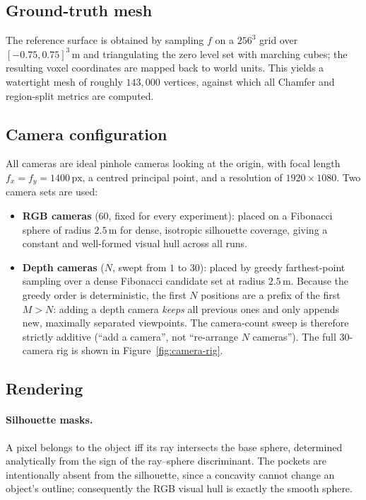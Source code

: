 \subsection{Ground-truth mesh}
\label{sec:dataset-gt}

The reference surface is obtained by sampling $f$ on a $256^{3}$ grid over $[-0.75, 0.75]^{3}\,\text{m}$
and triangulating the zero level set with marching cubes; the resulting voxel coordinates are mapped
back to world units. This yields a watertight mesh of roughly $143{,}000$ vertices, against which all
Chamfer and region-split metrics are computed.

\subsection{Camera configuration}
\label{sec:dataset-cameras}

All cameras are ideal pinhole cameras looking at the origin, with focal length
$f_{x} = f_{y} = 1400\,\text{px}$, a centred principal point, and a resolution of
$1920 \times 1080$. Two camera sets are used:
%
\begin{itemize}
  \item \textbf{RGB cameras} ($60$, fixed for every experiment): placed on a Fibonacci sphere of
    radius $2.5\,\text{m}$ for dense, isotropic silhouette coverage, giving a constant and well-formed
    visual hull across all runs.
  \item \textbf{Depth cameras} ($N$, swept from $1$ to $30$): placed by greedy farthest-point sampling
    over a dense Fibonacci candidate set at radius $2.5\,\text{m}$. Because the greedy order is
    deterministic, the first $N$ positions are a prefix of the first $M>N$: adding a depth camera
    \emph{keeps} all previous ones and only appends new, maximally separated viewpoints. The
    camera-count sweep is therefore strictly additive (``add a camera'', not ``re-arrange $N$
    cameras''). The full $30$-camera rig is shown in Figure~\ref{fig:camera-rig}.
\end{itemize}

\subsection{Rendering}
\label{sec:dataset-rendering}

\paragraph{Silhouette masks.} A pixel belongs to the object iff its ray intersects the base sphere,
determined analytically from the sign of the ray--sphere discriminant. The pockets are intentionally
absent from the silhouette, since a concavity cannot change an object's outline; consequently the RGB
visual hull is exactly the smooth sphere.

